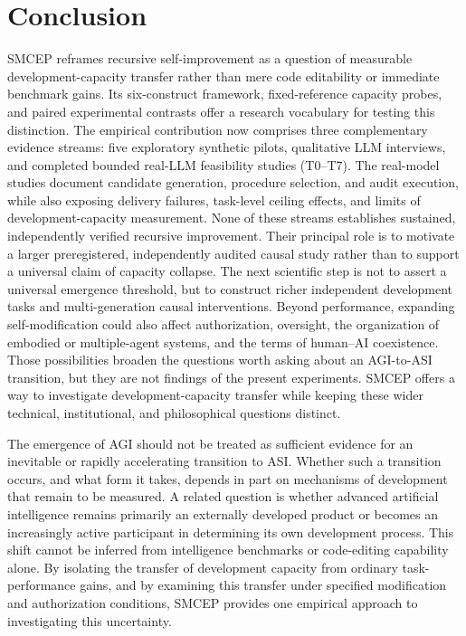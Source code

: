 \documentclass[11pt,a4paper]{article}
\begin{document}
\section{Conclusion}
SMCEP reframes recursive self-improvement as a question of measurable development-capacity transfer rather than mere code editability or immediate benchmark gains. Its six-construct framework, fixed-reference capacity probes, and paired experimental contrasts offer a research vocabulary for testing this distinction. The empirical contribution now comprises three complementary evidence streams: five exploratory synthetic pilots, qualitative LLM interviews, and completed bounded real-LLM feasibility studies (T0--T7). The real-model studies document candidate generation, procedure selection, and audit execution, while also exposing delivery failures, task-level ceiling effects, and limits of development-capacity measurement. None of these streams establishes sustained, independently verified recursive improvement. Their principal role is to motivate a larger preregistered, independently audited causal study rather than to support a universal claim of capacity collapse. The next scientific step is not to assert a universal emergence threshold, but to construct richer independent development tasks and multi-generation causal interventions. Beyond performance, expanding self-modification could also affect authorization, oversight, the organization of embodied or multiple-agent systems, and the terms of human--AI coexistence. Those possibilities broaden the questions worth asking about an AGI-to-ASI transition, but they are not findings of the present experiments. SMCEP offers a way to investigate development-capacity transfer while keeping these wider technical, institutional, and philosophical questions distinct.

The emergence of AGI should not be treated as sufficient evidence for an inevitable or rapidly accelerating transition to ASI. Whether such a transition occurs, and what form it takes, depends in part on mechanisms of development that remain to be measured. A related question is whether advanced artificial intelligence remains primarily an externally developed product or becomes an increasingly active participant in determining its own development process. This shift cannot be inferred from intelligence benchmarks or code-editing capability alone. By isolating the transfer of development capacity from ordinary task-performance gains, and by examining this transfer under specified modification and authorization conditions, SMCEP provides one empirical approach to investigating this uncertainty.
\end{document}
